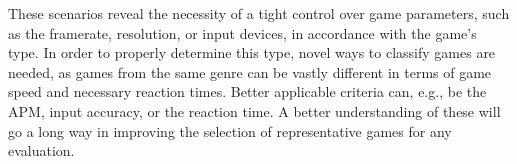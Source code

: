 These scenarios reveal the necessity of a tight control over game parameters, such as the framerate, resolution, or input devices, in accordance with the game's type. In order to properly determine this type, novel ways to classify games are needed, as games from the same genre can be vastly different in terms of game speed and necessary reaction times. Better applicable criteria can, e.g., be the \gls{APM}, input accuracy, or the reaction time. A better understanding of these will go a long way in improving the selection of representative games for any evaluation.



